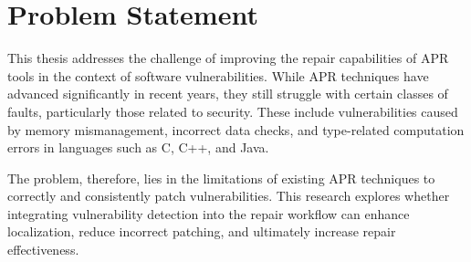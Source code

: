 \section{Problem Statement} \label{sec:ae3}

This thesis addresses the challenge of improving the repair capabilities of APR tools in the context of software vulnerabilities. While APR techniques have advanced significantly in recent years, they still struggle with certain classes of faults, particularly those related to security. These include vulnerabilities caused by memory mismanagement, incorrect data checks, and type-related computation errors in languages such as C, C++, and Java.


The problem, therefore, lies in the limitations of existing APR techniques to correctly and consistently patch vulnerabilities. This research explores whether integrating vulnerability detection into the repair workflow can enhance localization, reduce incorrect patching, and ultimately increase repair effectiveness.
